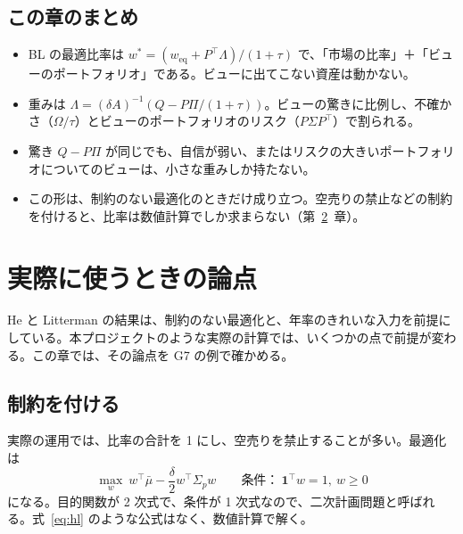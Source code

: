 \documentclass[xelatex,ja=standard,jafont=hiragino-pron,a4paper,11pt,openany]{bxjsreport}
\newcommand{\tabin}[1]{\adjustbox{max width=\linewidth}{}}
\newcommand{\T}{^{\top}}
\newcommand{\weq}{w_{\mathrm{eq}}}
\newcommand{\mub}{\bar{\mu}}
\newcommand{\Sp}{\Sigma_{p}}
\newcommand{\one}{\mathbf{1}}
\newcommand{\chapref}[1]{第~\ref{#1}~章}
\begin{document}
\section{この章のまとめ}

\begin{keybox}
\begin{itemize}
\item BL の最適比率は $w^* = (\weq + P\T\Lambda)/(1 + \tau)$ で、「市場の比率」＋「ビューのポートフォリオ」である。ビューに出てこない資産は動かない。
\item 重みは $\Lambda = (\delta A)^{-1}(Q - P\Pi/(1 + \tau))$。ビューの驚きに比例し、不確かさ（$\Omega/\tau$）とビューのポートフォリオのリスク（$P\Sigma P\T$）で割られる。
\item 驚き $Q - P\Pi$ が同じでも、自信が弱い、またはリスクの大きいポートフォリオについてのビューは、小さな重みしか持たない。
\item この形は、制約のない最適化のときだけ成り立つ。空売りの禁止などの制約を付けると、比率は数値計算でしか求まらない（\chapref{ch:practice}）。
\end{itemize}
\end{keybox}

\chapter{実際に使うときの論点}\label{ch:practice}

He と Litterman の結果は、制約のない最適化と、年率のきれいな入力を前提にしている。本プロジェクトのような実際の計算では、いくつかの点で前提が変わる。この章では、その論点を G7 の例で確かめる。

\section{制約を付ける}

実際の運用では、比率の合計を 1 にし、空売りを禁止することが多い。最適化は
\begin{equation}
\max_w\ w\T\mub - \frac{\delta}{2}w\T\Sp w
\qquad \text{条件：}\ \one\T w = 1,\ w \ge 0
\label{eq:qp}
\end{equation}
になる。目的関数が 2 次式で、条件が 1 次式なので、二次計画問題と呼ばれる。式~\eqref{eq:hl} のような公式はなく、数値計算で解く。

\begin{table}[htbp]
\centering
\caption{例 2 のビューで、最適化の条件を変えたときの比率（\%）。}
\label{tab:constraints}
\small\tabin{constraints}
\end{table}
\end{document}
